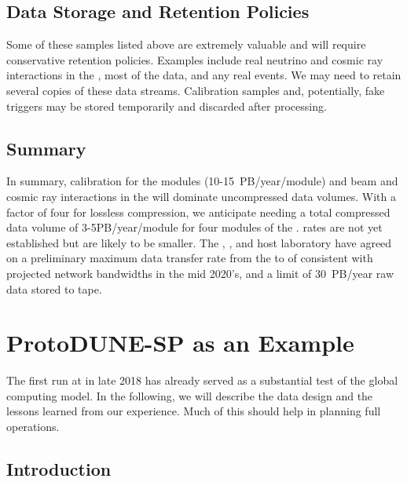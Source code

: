 \subsection{Data Storage and Retention Policies}
Some of these samples listed above are extremely valuable and will require conservative retention policies.   Examples include real neutrino and cosmic ray interactions in the , most of the  data, and any real  events.  We may need to retain several copies of these data streams. Calibration samples and, potentially, fake  triggers may be stored temporarily and discarded after processing. 


\subsection{Summary}
In summary, calibration for the  modules (10-15~PB/year/module) and beam and cosmic ray interactions in the  will dominate uncompressed data volumes.  With a  factor of four for lossless compression, we anticipate needing a total compressed data volume of 3-5PB/year/module for four modules of the .  rates are not yet established but are likely to be smaller.   
The ,   ,  and host laboratory %
have agreed on a preliminary maximum data transfer rate from the  to  of \surffnalbw consistent with projected network bandwidths in the mid 2020's, and a limit of \SI{30}{PB/year} raw data stored to tape. 


\section{ProtoDUNE-SP as an Example}
\label{ch:exec-comp-proto-SP}
The first   run at  in late 2018 has already served as a %
substantial test of the global computing model.  In the following, we will describe the  data design and the lessons learned from our experience. Much of this should help in planning full  operations. 

\subsection{Introduction}


